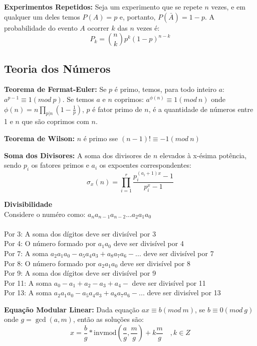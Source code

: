   {\bf Experimentos Repetidos:} Seja um experimento que se repete $n$
  vezes, e em qualquer um deles temos $P(A) = p$ e, portanto,
  $P(\bar{A}) = 1-p$. A probabilidade do evento $A$ ocorrer $k$ das
  $n$ vezes é:
  $$
  P_{k} = {n \choose k} p^{k}(1-p)^{n-k}
  $$
  \subsection{Teoria dos Números}
  {\bf Teorema de Fermat-Euler:}
  Se $p$ é primo, temos, para todo inteiro $a$: $a^{p-1} \equiv 1 (mod\ p)$.  
  Se temos $a$ e $n$ coprimos: $a^{\phi(n)} \equiv 1 (mod\ n)$
  onde $\phi(n) = n \prod_{p|n} \left( 1 - \frac{1}{p} \right)$, $p$ é fator
  primo de $n$, é a quantidade de números entre 1 e $n$ que são coprimos com $n$.

  {\bf Teorema de Wilson:}
  $n$ é primo sse $(n-1)! \equiv -1 (mod\ n)$
  
  {\bf Soma dos Divisores:}
  A soma dos divisores de $n$ elevados à x-ésima potência, sendo $p_i$ os fatores
  primos e $a_i$ os expoentes correspondentes:
  \[
    \sigma_{x}(n)=\prod_{i=1}^{r}\frac{p_{i}^{(a_{i}+1)x}-1}{p_{i}^{x}-1}
  \]

  {\bf Divisibilidade}
  \\
  Considere o numéro como: $a_{n}a_{n-1}a_{n-2}...a_{2}a_{1}a_{0}$
  \\
  \\
  Por 3: A soma dos dígitos deve ser divisível por 3
  \\
  Por 4: O número formado por $a_{1}a_{0}$ deve ser divisível por 4
  \\
  Por 7: A soma $a_{2}a_{1}a_{0}-a_{5}a_{4}a_{3} + a_{8}a_{7}a_{6}-...$ deve ser divisível por 7
  \\
  Por 8: O número formado por $a_{2}a_{1}a_{0}$ deve ser divisível por 8
  \\
  Por 9: A soma dos dígitos deve ser divisível por 9
  \\
  Por 11: A soma $a_{0}-a_{1}+a_{2}-a_{3}+a_{4}-$ deve ser divisível por 11
  \\
  Por 13: A soma $a_{2}a_{1}a_{0}-a_{5}a_{4}a_{3} + a_{8}a_{7}a_{6}-...$ deve ser divisível por 13

  {\bf Equação Modular Linear:}
  Dada equação $ax \equiv b (mod\ m)$, se $b \equiv 0 (mod\ g)$
  onde $g=\gcd(a,m)$, então as soluções são:
  $$
  x = \frac{b}{g}*\textrm{invmod}(\frac{a}{g},\frac{m}{g}) + k\frac{m}{g}\quad, k \in Z
  $$
